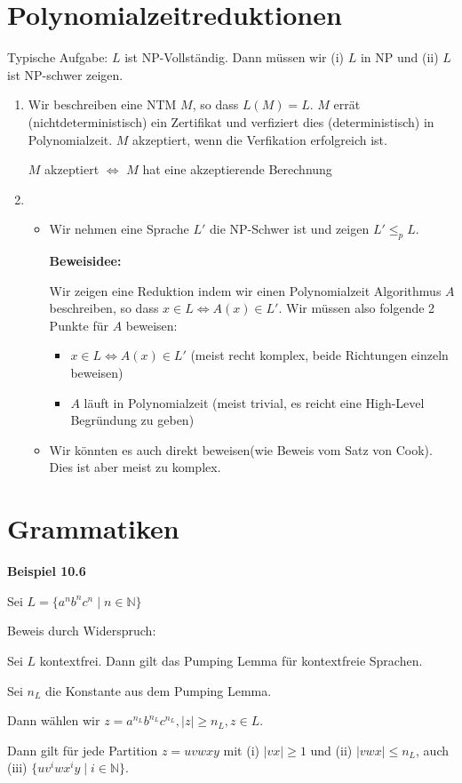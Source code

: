 \documentclass[a4paper, 11pt]{article}
\def\N{\mathbb{N}}
\begin{document}
    



    \section{Polynomialzeitreduktionen}

    Typische Aufgabe: $L$ ist NP-Vollständig. Dann müssen wir (i) $L$ in NP und (ii) $L$ ist NP-schwer zeigen.

    \begin{enumerate}[label = (\roman*)]
        \item Wir beschreiben eine NTM $M$, so dass $L(M) = L$. $M$ errät (nichtdeterministisch) ein Zertifikat und verfiziert dies (deterministisch) in Polynomialzeit.
        $M$ akzeptiert, wenn die Verfikation erfolgreich ist.

        $M$ akzeptiert $\iff$ $M$ hat eine akzeptierende Berechnung
        \item \begin{itemize}
             \item Wir nehmen eine Sprache $L'$ die NP-Schwer ist und zeigen $L' \leq_{p} L$.
             
                \textbf{Beweisidee: }
                
                Wir zeigen eine Reduktion indem wir einen Polynomialzeit Algorithmus $A$ beschreiben, so dass $x \in L \iff A(x) \in L'$.
                Wir müssen also folgende 2 Punkte für $A$ beweisen:
                \begin{itemize}
                    \item $x \in L \iff A(x) \in L'$ (meist recht komplex, beide Richtungen einzeln beweisen)
                    \item $A$ läuft in Polynomialzeit (meist trivial, es reicht eine High-Level Begründung zu geben)
                \end{itemize}


             \item Wir könnten es auch direkt beweisen(wie Beweis vom Satz von Cook). Dies ist aber meist zu komplex.
        \end{itemize}
    \end{enumerate}

    




    \section{Grammatiken}



    \textbf{Beispiel 10.6}

    Sei $L = \{a^nb^nc^n \mid n \in \N\}$
   
    Beweis durch Widerspruch:

    Sei $L$ kontextfrei. Dann gilt das Pumping Lemma für kontextfreie Sprachen.

    Sei $n_L$  die Konstante aus dem Pumping Lemma.

    Dann wählen wir $z = a^{n_L}b^{n_L}c^{n_L}, |z| \geq n_L, z \in L$.

    Dann gilt für jede Partition $z = uvwxy$ mit (i) $|vx| \geq 1$ und (ii) $|vwx| \leq n_L$, auch (iii) $\{uv^iwx^iy \mid i \in \N\}$.
\end{document}
